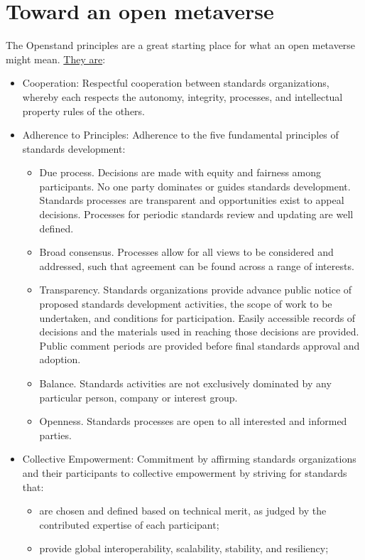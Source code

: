 \section{Toward an open metaverse}
The Openstand principles are a great starting place for what an open metaverse might mean. \href{https://open-stand.org/about-us/principles/}{They are}:\\
\begin{itemize}
\item Cooperation: Respectful cooperation between standards organizations, whereby each respects the autonomy, integrity, processes, and intellectual property rules of the others.
\item Adherence to Principles: Adherence to the five fundamental principles of standards development:
\begin{itemize}
\item Due process. Decisions are made with equity and fairness among participants. No one party dominates or guides standards development. Standards processes are transparent and opportunities exist to appeal decisions. Processes for periodic standards review and updating are well defined.
\item Broad consensus. Processes allow for all views to be considered and addressed, such that agreement can be found across a range of interests.
\item Transparency. Standards organizations provide advance public notice of proposed standards development activities, the scope of work to be undertaken, and conditions for participation. Easily accessible records of decisions and the materials used in reaching those decisions are provided. Public comment periods are provided before final standards approval and adoption.
\item Balance. Standards activities are not exclusively dominated by any particular person, company or interest group.
\item Openness. Standards processes are open to all interested and informed parties.
\end{itemize}
\item Collective Empowerment: Commitment by affirming standards organizations and their participants to collective empowerment by striving for standards that:
\begin{itemize}
\item are chosen and defined based on technical merit, as judged by the contributed expertise of each participant;
\item provide global interoperability, scalability, stability, and resiliency;

\end{itemize}
\end{itemize}
